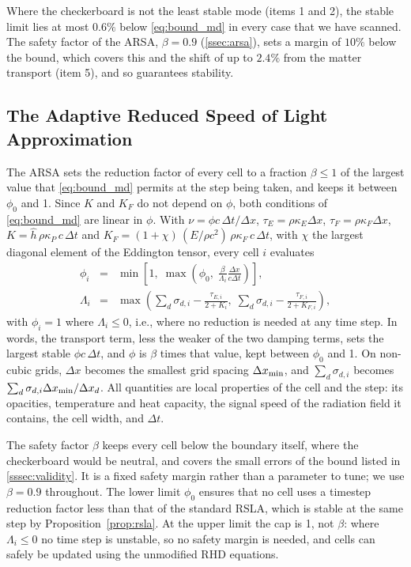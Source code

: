 \documentclass[preprint,12pt,authoryear]{elsarticle}
\begin{document}
Where the checkerboard is not the least stable mode (items 1 and 2), the stable limit lies at most $0.6\%$ below \autoref{eq:bound_md} in every case that we have scanned. The safety factor of the ARSA, $\beta = 0.9$ (\autoref{ssec:arsa}), sets a margin of $10\%$ below the bound, which covers this and the shift of up to $2.4\%$ from the matter transport (item 5), and so guarantees stability.


\subsection{The Adaptive Reduced Speed of Light Approximation}
\label{ssec:arsa}

The ARSA sets the reduction factor of every cell to a fraction $\beta \leq 1$ of the largest value that \autoref{eq:bound_md} permits at the step being taken, and keeps it between $\phi_0$ and 1. Since $K$ and $K_F$ do not depend on $\phi$, both conditions of \autoref{eq:bound_md} are linear in $\phi$. With $\nu = \phi c\,\Delta t/\Delta x$, $\tau_E = \rho\kappa_E\Delta x$, $\tau_F = \rho\kappa_F\Delta x$, $K = \hat{h}\,\rho\kappa_P\,c\,\Delta t$ and $K_F = (1 + \chi)\,(E/\rho c^2)\,\rho\kappa_F\,c\,\Delta t$, with $\chi$ the largest diagonal element of the Eddington tensor, every cell $i$ evaluates
\begin{eqnarray}
    \phi_i & = & \min\left[1,\; \max\left(\phi_0,\; \frac{\beta}{\Lambda_i}\frac{\Delta x}{c\Delta t}\right)\right],
    \nonumber \\
    \Lambda_i & = & \max\left(\sum_d\sigma_{d,i} - \frac{\tau_{E,i}}{2 + K_i},\; \sum_d\sigma_{d,i} - \frac{\tau_{F,i}}{2 + K_{F,i}}\right),
    \label{eq:phi_sb}
\end{eqnarray}
with $\phi_i = 1$ where $\Lambda_i \leq 0$, i.e., where no reduction is needed at any time step. In words, the transport term, less the weaker of the two damping terms, sets the largest stable $\phi c\,\Delta t$, and $\phi$ is $\beta$ times that value, kept between $\phi_0$ and 1. On non-cubic grids, $\Delta x$ becomes the smallest grid spacing $\Delta x_{\rm min}$, and $\sum_d\sigma_{d,i}$ becomes $\sum_d\sigma_{d,i}\Delta x_{\rm min}/\Delta x_d$. All quantities are local properties of the cell and the step: its opacities, temperature and heat capacity, the signal speed of the radiation field it contains, the cell width, and $\Delta t$.

The safety factor $\beta$ keeps every cell below the boundary itself, where the checkerboard would be neutral, and covers the small errors of the bound listed in \autoref{sssec:validity}. It is a fixed safety margin rather than a parameter to tune; we use $\beta = 0.9$ throughout. The lower limit $\phi_0$ ensures that no cell uses a timestep reduction factor less than that of the standard RSLA, which is stable at the same step by Proposition~\ref{prop:rsla}. At the upper limit the cap is 1, not $\beta$: where $\Lambda_i \leq 0$ no time step is unstable, so no safety margin is needed, and cells can safely be updated using the unmodified RHD equations.
\end{document}
